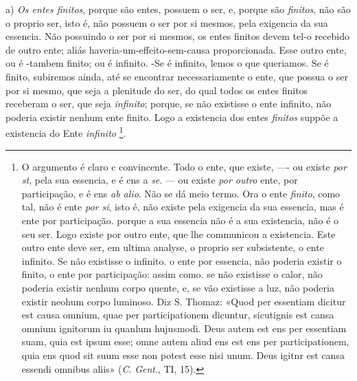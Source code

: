 a) \emph{Os entes finitos}, porque são entes, possuem o ser, e, porque são \emph{finitos}, não são o proprio ser, isto é, não possuem o ser por si mesmos, pela exigencia da sua essencia. Não possuindo o ser por si mesmos, os entes finitos devem tel-o recebido de outro ente; aliás haveria-um-effeito-sem-causa proporcionada. Esse outro ente, ou é -tambem finito; ou é infinito. -Se é infinito, lemos o que queriamos. Se é finito, subiremos ainda, até se encontrar necessariamente o ente, que possua o ser por si mesmo, que seja a plenitude do ser, do qual todos os entes finitos receberam o ser, que seja \emph{infinito}; porque, se não existisse o ente infinito, não poderia existir nenhum ente finito. Logo a existencia dos entes \emph{finitos} suppõe a existencia do Ente \emph{infinito} \footnote{O argumento é claro c convincente. Todo o ente, que existe, ---- ou existe \emph{por st}, pela sua essencia, e é ens a \emph{se}. --- ou existe \emph{por outro} ente, por participação, e é ens \emph{ab alio}. Não se dá meio termo. Ora o ente \emph{finito}, como tal, não é ente \emph{por si}, isto é, não existe pela exigencia da sua essencia, mas é ente por participação. porque a sua essencia não é a sua existencia, não é o seu ser. Logo existe por outro ente, que lhe communicou a existencia. Este outro ente deve ser, em ultima analyse, o proprio ser subsistente, o ente infinito. Se não existisse o infinito. o ente por essencia, não poderia existir o finito, o ente por participação: assim como. se não existisse o calor, não poderia existir nenhum corpo quente, e, se vão existisse a luz, não poderia existir neohum corpo luminoso. Diz S. Thomaz: «Quod per essentiam dicitur est causa omnium, quae per participationem dicuntur, sicutignis est cansa omnium ignitorum iu quanlum hujusmodi. Deus autem est ens per essentiam suam, quia est ipsum esse; omne autem aliud ens est ens per participationem, quia ens quod sit suum esse non potest esse nisi unum. Deus igitnr est cansa essendi omnibus aliis» (\emph{C}. \emph{Gent}., TI, 15).}.

